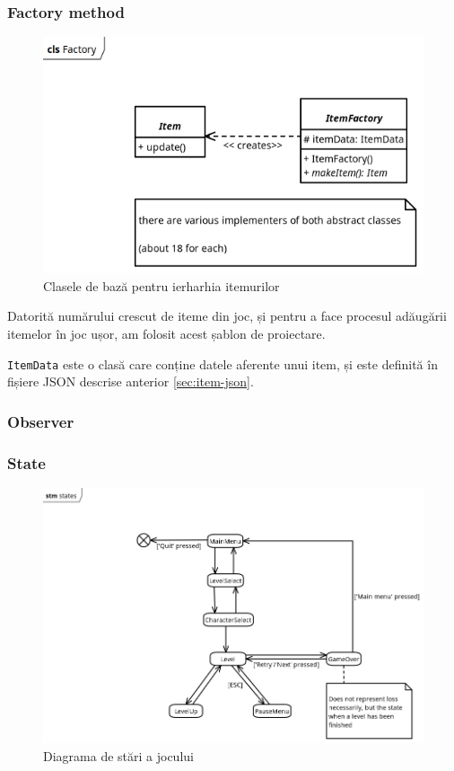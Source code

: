 \documentclass{article}
\begin{document}
    \subsubsection{Factory method}
    \begin{figure}[H]
        \includegraphics[width=\textwidth]{factory-diagram}
        \centering
        \caption{Clasele de bază pentru ierharhia itemurilor}
    \end{figure}

    Datorită numărului crescut de iteme din joc, și pentru a face procesul adăugării itemelor în joc
    ușor, am folosit acest șablon de proiectare.

    \texttt{ItemData} este o clasă care conține datele aferente unui item, și este definită în
    fișiere JSON descrise anterior \ref{sec:item-json}.

    \subsubsection{Observer}
    \subsubsection{State}

    \begin{figure}[H]
        \includegraphics[width=\textwidth]{state-diagram}
        \centering
        \caption{Diagrama de stări a jocului}
    \end{figure}
\end{document}
